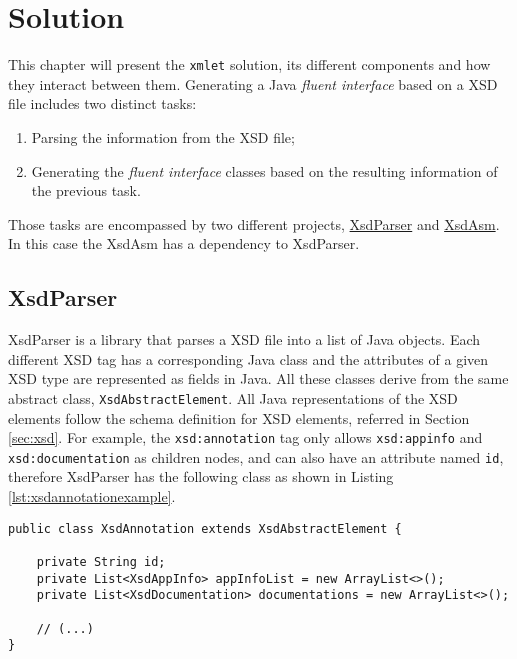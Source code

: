 \chapter{Solution}
\label{cha:solution}

\sloppy

This chapter will present the \texttt{xmlet} solution, its different components and how they interact between them. Generating a Java \textit{fluent interface} based on a \ac{XSD} file includes two distinct tasks:

\begin{enumerate}
\item Parsing the information from the \ac{XSD} file;
\item Generating the \textit{fluent interface} classes based on the resulting information of the previous task.
\end{enumerate}

\noindent
Those tasks are encompassed by two different projects, \hyperref[sec:xsdparser]{XsdParser} and \hyperref[sec:xsdasm]{XsdAsm}. In this case the XsdAsm has a dependency to XsdParser.

\section{XsdParser} %
\label{sec:xsdparser}

XsdParser is a library that parses a \ac{XSD} file into a list of Java objects. Each different \ac{XSD} tag has a corresponding Java class and the  attributes of a given \ac{XSD} type are represented as fields in Java. All these classes derive from the same abstract class, \texttt{XsdAbstractElement}. All Java representations of the \ac{XSD} elements follow the schema definition for \ac{XSD} elements, referred in Section \ref{sec:xsd}. For example, the \texttt{xsd:annotation} tag only allows \texttt{xsd:appinfo} and \texttt{xsd:documentation} as children nodes, and can also have an attribute named \texttt{id}, therefore XsdParser has the following class as shown in Listing \ref{lst:xsdannotationexample}.

\bigskip


\begin{minipage}{\linewidth}
\begin{lstlisting}[caption={Simplified Version of the Generated XsdAnnotation Class}, label={lst:xsdannotationexample}]
public class XsdAnnotation extends XsdAbstractElement {

    private String id;
    private List<XsdAppInfo> appInfoList = new ArrayList<>();
    private List<XsdDocumentation> documentations = new ArrayList<>();
    
    // (...)
}
\end{lstlisting}
\end{minipage}

